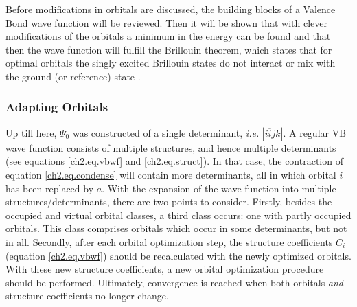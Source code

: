 Before modifications in orbitals are discussed, the building blocks of a Valence Bond wave function will be reviewed. Then it will be shown that with clever modifications of the orbitals a minimum in the energy can be found and that then the wave function will fulfill the Brillouin theorem, which states that for optimal orbitals the singly excited Brillouin states do not interact or mix with the ground (or reference) state \cite{brillouin}. 

\subsubsection{Adapting Orbitals}

Up till here, $\Psi_0$ was constructed of a single determinant, \textit{i.e.} $|i\overline{i}jk|$. A regular VB wave function consists of multiple structures, and hence multiple determinants (see equations \ref{ch2.eq.vbwf} and \ref{ch2.eq.struct}). In that case, the contraction of equation \ref{ch2.eq.condense} will contain more determinants, all in which orbital $i$ has been replaced by $a$. With the expansion of the wave function into multiple structures/determinants, there are two points to consider. Firstly, besides the occupied and virtual orbital classes, a third class occurs: one with partly occupied orbitals. This class comprises orbitals which occur in some determinants, but not in all. Secondly, after each orbital optimization step, the structure coefficients $C_i$ (equation \ref{ch2.eq.vbwf}) should be recalculated with the newly optimized orbitals. With these new structure coefficients, a new orbital optimization procedure should be performed. Ultimately, convergence is reached when both orbitals \textit{and} structure coefficients no longer change.

